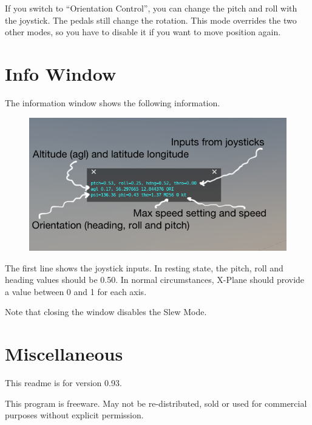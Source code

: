 \documentclass[a4paper,12pt]{article}
\begin{document}
\vspace{0.5\baselineskip}
If you switch to ``Orientation Control'', you can change the pitch and
roll with the joystick. The pedals still change the rotation. This
mode overrides the two other modes, so you have to disable it if you
want to move position again.


\clearpage
\section*{Info Window}

The information window shows the following information. 

\begin{figure}[h!]%
\centering
\includegraphics[width=1.0\textwidth]{infowindow.png}
\label{fig:infowindow}
\end{figure}

The first line shows the joystick inputs. In resting state, the pitch, roll and
heading values should be 0.50. In normal circumstances, X-Plane should provide a
value between 0 and 1 for each axis.

Note that closing the window disables the Slew Mode.

\vspace{\baselineskip}
\section*{Miscellaneous}

This readme is for version 0.93. 

\vspace{0.5\baselineskip} {\color{text1}This program is freeware. May not be
  re-distributed, sold or used for commercial purposes without explicit
  permission.}
\end{document}
